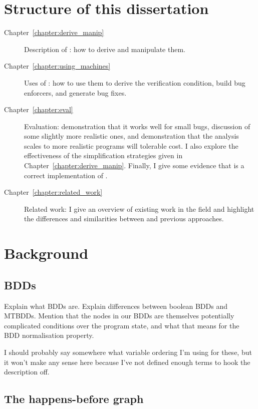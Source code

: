 
\section{Structure of this dissertation}

\begin{description}
\item[Chapter~\ref{chapter:derive_manip}] Description of
  \StateMachines: how to derive and manipulate them.
\item[Chapter~\ref{chapter:using_machines}] Uses of \StateMachines:
  how to use them to derive the verification condition, build bug
  enforcers, and generate bug fixes.
\item[Chapter~\ref{chapter:eval}] Evaluation: demonstration that it
  works well for small bugs, discussion of some slightly more
  realistic ones, and demonstration that the analysis scales to more
  realistic programs will tolerable cost.  I also explore the
  effectiveness of the {\StateMachine} simplification strategies given
  in Chapter~\ref{chapter:derive_manip}.  Finally, I give some
  evidence that {\implementation} is a correct implementation of
  {\technique}.
\item[Chapter~\ref{chapter:related_work}] Related work: I give an
  overview of existing work in the field and highlight the differences
  and similarities between {\technique} and previous approaches.
\end{description}

\section{Background}
\subsection{BDDs}

Explain what BDDs are.  Explain differences between boolean BDDs and
MTBDDs.  Mention that the nodes in our BDDs are themselves potentially
complicated conditions over the program state, and what that means for
the BDD normalisation property.

I should probably say somewhere what variable ordering I'm using for
these, but it won't make any sense here because I've not defined
enough terms to hook the description off.

\subsection{The happens-before graph}

